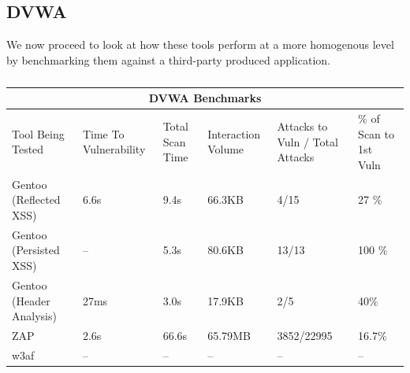\subsection{DVWA}

We now proceed to look at how these tools perform at a more homogenous level by benchmarking them against a third-party produced application. \\
\begin{table}[h]
	
	{

		\captionsetup{justification=centering}		
		\caption{}
		\label{table:dvwa_benchmarks}
		\begin{tabular}{ |p{4cm}||p{1.4cm}|p{1.4cm}|p{1.6cm}|p{2cm}|p{2cm}| }
			\hline
			\multicolumn{6}{|c|}{\textbf{DVWA Benchmarks}} \\ [0.5ex]
			\hline \hline 
			Tool Being Tested& Time To Vulnerability & Total Scan Time & Interaction Volume & Attacks to Vuln / Total Attacks & \% of Scan to 1st Vuln \\
			\hline
			Gentoo (Reflected XSS)    & 6.6s      & 9.4s    &   66.3KB          & 4/15 & 27 \% \\
			Gentoo (Persisted XSS)    &  -- & 5.3s & 80.6KB & 13/13 & 100 \% \\
			Gentoo (Header Analysis) & 27ms    &  3.0s    & 17.9KB   &  2/5 & 40\%\\
			ZAP                                  & 2.6s & 66.6s     &  65.79MB & 3852/22995& 16.7\%\\ 
			w3af                                 & -- & -- & -- & -- &-- \\
			\hline
		\end{tabular}
	} \\
\end{table}

